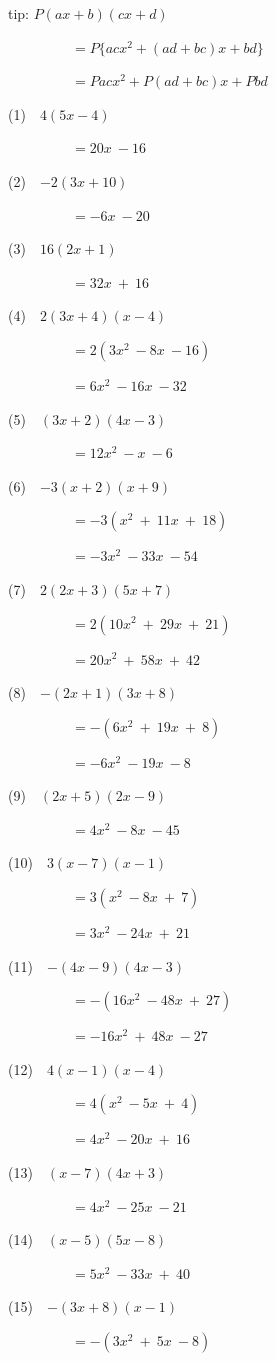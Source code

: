 \documentclass[a4j,twocolumn,10pt,fleqn]{jarticle}
\begin{document}
tip: $P(ax + b)(cx + d)$

~~~~~~~~~$= P\{acx^2 + (ad + bc)x +bd\}$

~~~~~~~~~$= Pacx^2 + P(ad + bc)x + Pbd$

(1)~~$4(5x-4)$

~~~~~~~~~$=20x~-16$

(2)~~$-2(3x+10)$

~~~~~~~~~$=-6x~-20$

(3)~~$16(2x+1)$

~~~~~~~~~$=32x~+~16$

(4)~~$2(3x+4)(x-4)$

~~~~~~~~~$=2(3x^2~-8x~-16)$

~~~~~~~~~$=6x^2~-16x~-32$

(5)~~$(3x+2)(4x-3)$

~~~~~~~~~$=12x^2~-x~-6$

(6)~~$-3(x+2)(x+9)$

~~~~~~~~~$=-3(x^2~+~11x~+~18)$

~~~~~~~~~$=-3x^2~-33x~-54$

(7)~~$2(2x+3)(5x+7)$

~~~~~~~~~$=2(10x^2~+~29x~+~21)$

~~~~~~~~~$=20x^2~+~58x~+~42$

(8)~~$-(2x+1)(3x+8)$

~~~~~~~~~$=-(6x^2~+~19x~+~8)$

~~~~~~~~~$=-6x^2~-19x~-8$

(9)~~$(2x+5)(2x-9)$

~~~~~~~~~$=4x^2~-8x~-45$

(10)~~$3(x-7)(x-1)$

~~~~~~~~~$=3(x^2~-8x~+~7)$

~~~~~~~~~$=3x^2~-24x~+~21$

(11)~~$-(4x-9)(4x-3)$

~~~~~~~~~$=-(16x^2~-48x~+~27)$

~~~~~~~~~$=-16x^2~+~48x~-27$

(12)~~$4(x-1)(x-4)$

~~~~~~~~~$=4(x^2~-5x~+~4)$

~~~~~~~~~$=4x^2~-20x~+~16$

(13)~~$(x-7)(4x+3)$

~~~~~~~~~$=4x^2~-25x~-21$

(14)~~$(x-5)(5x-8)$

~~~~~~~~~$=5x^2~-33x~+~40$

(15)~~$-(3x+8)(x-1)$

~~~~~~~~~$=-(3x^2~+~5x~-8)$
\end{document}
